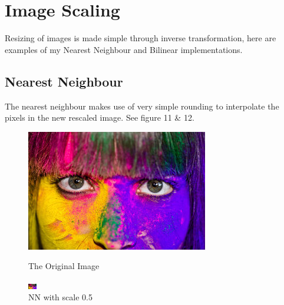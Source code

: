 \documentclass{article}
\begin{document}
\section{Image Scaling}
Resizing of images is made simple through inverse transformation, here are examples of my Nearest Neighbour and Bilinear implementations.

\subsection{Nearest Neighbour}
The nearest neighbour makes use of very simple rounding to interpolate the pixels in the new rescaled image. See figure 11 \& 12.

\begin{figure}[h!]
\centering
  \begin{minipage}[b]{0.45\textwidth}
    \includegraphics[width=\textwidth]{colour.jpg}
    \caption{The Original Image}
  \end{minipage}
  \hfill
  \begin{minipage}[b]{0.45\textwidth}
    \includegraphics[width=\textwidth]{NN_0_05.png}
    \caption{NN with scale 0.5}
  \end{minipage}
\end{figure}
\end{document}
